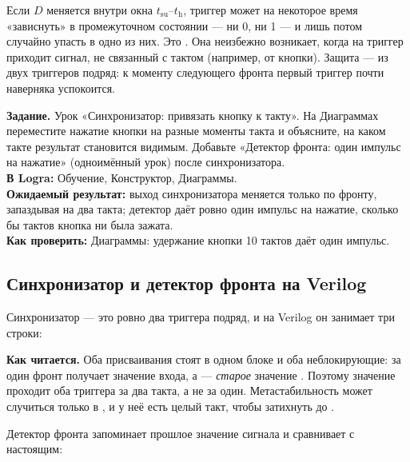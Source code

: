 \begin{warnbox}[Метастабильность]
Если $D$ меняется внутри окна $t_\text{su}$--$t_\text{h}$, триггер может на
некоторое время «зависнуть» в промежуточном состоянии --- ни 0, ни 1 --- и
лишь потом случайно упасть в одно из них. Это . Она
неизбежно возникает, когда на триггер приходит сигнал, не связанный с
тактом (например, от кнопки). Защита ---  из двух
триггеров подряд: к моменту следующего фронта первый триггер почти наверняка
успокоится.
\end{warnbox}

\begin{diybox}
\textbf{Задание.}  Урок «Синхронизатор: привязать кнопку к такту».
 На Диаграммах переместите нажатие кнопки на разные моменты такта и
объясните, на каком такте результат становится видимым.  Добавьте
«Детектор фронта: один импульс на нажатие» (одноимённый урок) после
синхронизатора.\\
\textbf{В Logra:} Обучение, Конструктор, Диаграммы.\\
\textbf{Ожидаемый результат:} выход синхронизатора меняется только по фронту,
запаздывая на два такта; детектор даёт ровно один импульс на нажатие, сколько
бы тактов кнопка ни была зажата.\\
\textbf{Как проверить:} Диаграммы: удержание кнопки 10 тактов даёт
один импульс.
\end{diybox}

\subsection{Синхронизатор и детектор фронта на Verilog}
\label{sec:ff-sync-v}

Синхронизатор --- это ровно два триггера подряд, и на Verilog он занимает три
строки:


\textbf{Как читается.} Оба присваивания стоят в одном блоке и оба
неблокирующие: за один фронт  получает значение входа, а 
--- \emph{старое} значение . Поэтому значение проходит оба
триггера за два такта, а не за один. Метастабильность может случиться
только в , и у неё есть целый такт, чтобы затихнуть до .

Детектор фронта запоминает прошлое значение сигнала и сравнивает с
настоящим:


